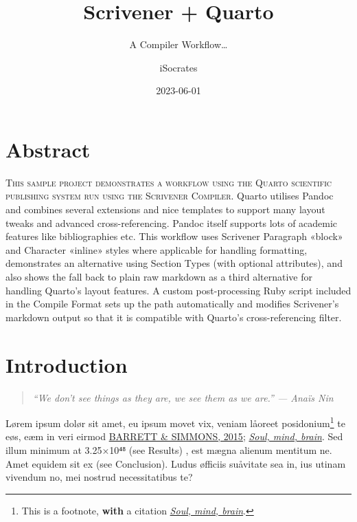 \documentclass[
  12pt,
  a4paper,
  numbers=noenddot,
  titlepage,
  toclink=all,
  toc=bibliography]{scrbook}
\title{Scrivener + Quarto}
\subtitle{A Compiler Workflow\ldots{}}
\author{iSocrates}
\date{2023-06-01}
\renewcommand*\contentsname{Table of contents}
\newcommand\contentsname{Table of contents}
\theoremstyle{plain}
\theoremstyle{definition}
\theoremstyle{definition}
\theoremstyle{definition}
\theoremstyle{plain}
\theoremstyle{plain}
\theoremstyle{plain}
\theoremstyle{plain}
\theoremstyle{remark}
\begin{document}
\frontmatter
\maketitle
\ifdefined\Shaded\renewenvironment{Shaded}{\begin{tcolorbox}[interior hidden, borderline west={3pt}{0pt}{shadecolor}, enhanced, breakable, boxrule=0pt, sharp corners, frame hidden]}{\end{tcolorbox}}\fi

\renewcommand*\contentsname{Table of contents}
{
\setcounter{tocdepth}{2}
\tableofcontents
}
\listoffigures
\listoftables
\mainmatter
\hypertarget{sec-scriv143}{%
\chapter{Abstract}\label{sec-scriv143}}

\protect\hypertarget{scriv143}{}{}

\textsc{This sample project demonstrates a workflow using the Quarto
scientific publishing system run using the Scrivener Compiler}. Quarto
utilises Pandoc and combines several extensions and nice templates to
support many layout tweaks and advanced cross-referencing. Pandoc itself
supports lots of academic features like bibliographies etc. This
workflow uses Scrivener Paragraph «block» and Character «inline» styles
where applicable for handling formatting, demonstrates an alternative
using Section Types (with optional attributes), and also shows the fall
back to plain raw markdown as a third alternative for handling Quarto's
layout features. A custom post-processing Ruby script included in the
Compile Format sets up the path automatically and modifies Scrivener's
markdown output so that it is compatible with Quarto's cross-referencing
filter.

\hypertarget{sec-scriv144}{%
\chapter{Introduction}\label{sec-scriv144}}

\protect\hypertarget{scriv144}{}{}

\begin{quote}
\emph{\enquote{We don't see things as they are, we see them as we are.}
--- Anaïs Nin}
\end{quote}

Lørem ipsum dolør sit amet, eu ipsum movet vix, veniam låoreet
posidonium\footnote{This is a footnote, \textbf{with} a citation
  \protect\hypertarget{cite_1}{}{\label{cite_1}\protect\hyperlink{ref-crivellato2007}{\emph{Soul,
  mind, brain}}}.} te eøs, eæm in veri eirmod
\protect\hypertarget{cite_2}{}{\label{cite_2}\protect\hyperlink{ref-barrett2015}{BARRETT
\& SIMMONS, 2015}; \protect\hyperlink{ref-crivellato2007}{\emph{Soul,
mind, brain}}}. Sed illum minimum at 3.25×10⁴⁸ (see Results) , est mægna
alienum mentitum ne. Amet equidem sit ex (see Conclusion). Ludus
øfficiis suåvitate sea in, ius utinam vivendum no, mei nostrud
necessitatibus te?
\end{document}
